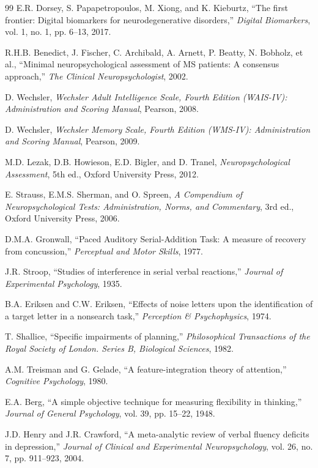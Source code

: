 \documentclass[12pt,a4paper]{report}
\begin{document}
\begin{thebibliography}{99}
E.R. Dorsey, S. Papapetropoulos, M. Xiong, and K. Kieburtz,
``The first frontier: Digital biomarkers for neurodegenerative disorders,''
\textit{Digital Biomarkers}, vol. 1, no. 1, pp. 6--13, 2017.

R.H.B. Benedict, J. Fischer, C. Archibald, A. Arnett, P. Beatty, N. Bobholz, et al.,
``Minimal neuropsychological assessment of MS patients: A consensus approach,''
\textit{The Clinical Neuropsychologist}, 2002.

D. Wechsler,
\textit{Wechsler Adult Intelligence Scale, Fourth Edition (WAIS-IV): Administration and Scoring Manual},
Pearson, 2008.

D. Wechsler,
\textit{Wechsler Memory Scale, Fourth Edition (WMS-IV): Administration and Scoring Manual},
Pearson, 2009.

M.D. Lezak, D.B. Howieson, E.D. Bigler, and D. Tranel,
\textit{Neuropsychological Assessment},
5th ed., Oxford University Press, 2012.

E. Strauss, E.M.S. Sherman, and O. Spreen,
\textit{A Compendium of Neuropsychological Tests: Administration, Norms, and Commentary},
3rd ed., Oxford University Press, 2006.

D.M.A. Gronwall,
``Paced Auditory Serial-Addition Task: A measure of recovery from concussion,''
\textit{Perceptual and Motor Skills}, 1977.

J.R. Stroop,
``Studies of interference in serial verbal reactions,''
\textit{Journal of Experimental Psychology}, 1935.

B.A. Eriksen and C.W. Eriksen,
``Effects of noise letters upon the identification of a target letter in a nonsearch task,''
\textit{Perception \& Psychophysics}, 1974.

T. Shallice,
``Specific impairments of planning,''
\textit{Philosophical Transactions of the Royal Society of London. Series B, Biological Sciences}, 1982.

A.M. Treisman and G. Gelade,
``A feature-integration theory of attention,''
\textit{Cognitive Psychology}, 1980.

E.A. Berg,
``A simple objective technique for measuring flexibility in thinking,''
\textit{Journal of General Psychology}, vol. 39, pp. 15--22, 1948.

J.D. Henry and J.R. Crawford,
``A meta-analytic review of verbal fluency deficits in depression,''
\textit{Journal of Clinical and Experimental Neuropsychology}, vol. 26, no. 7, pp. 911--923, 2004.


\end{thebibliography}
\end{document}
